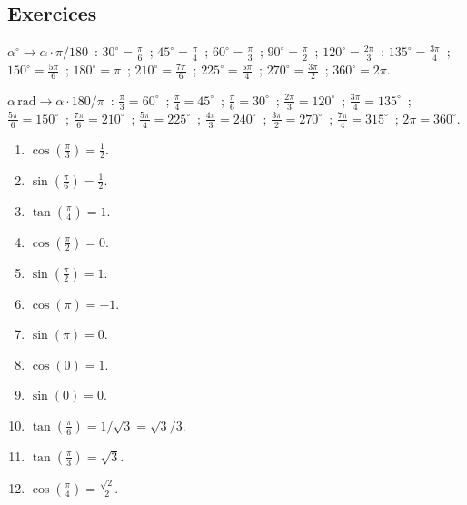 
\subsection*{Exercices}


$\alpha^{\circ}\to\alpha\cdot\pi/180$~:
$30^{\circ}=\frac{\pi}{6}$~; $45^{\circ}=\frac{\pi}{4}$~; $60^{\circ}=\frac{\pi}{3}$~; $90^{\circ}=\frac{\pi}{2}$~;
$120^{\circ}=\frac{2\pi}{3}$~; $135^{\circ}=\frac{3\pi}{4}$~; $150^{\circ}=\frac{5\pi}{6}$~; $180^{\circ}=\pi$~;
$210^{\circ}=\frac{7\pi}{6}$~; $225^{\circ}=\frac{5\pi}{4}$~; $270^{\circ}=\frac{3\pi}{2}$~; $360^{\circ}=2\pi$.


$\alpha\,\text{rad}\to\alpha\cdot180/\pi$~:
$\frac{\pi}{3}=60^{\circ}$~; $\frac{\pi}{4}=45^{\circ}$~; $\frac{\pi}{6}=30^{\circ}$~; $\frac{2\pi}{3}=120^{\circ}$~;
$\frac{3\pi}{4}=135^{\circ}$~; $\frac{5\pi}{6}=150^{\circ}$~; $\frac{7\pi}{6}=210^{\circ}$~; $\frac{5\pi}{4}=225^{\circ}$~;
$\frac{4\pi}{3}=240^{\circ}$~; $\frac{3\pi}{2}=270^{\circ}$~; $\frac{7\pi}{4}=315^{\circ}$~; $2\pi=360^{\circ}$.


\begin{enumerate}
  \item $\cos(\frac{\pi}{3})=\frac{1}{2}$.
  \item $\sin(\frac{\pi}{6})=\frac{1}{2}$.
  \item $\tan(\frac{\pi}{4})=1$.
  \item $\cos(\frac{\pi}{2})=0$.
  \item $\sin(\frac{\pi}{2})=1$.
  \item $\cos(\pi)=-1$.
  \item $\sin(\pi)=0$.
  \item $\cos(0)=1$.
  \item $\sin(0)=0$.
  \item $\tan(\frac{\pi}{6})=1/\sqrt{3}=\sqrt{3}/3$.
  \item $\tan(\frac{\pi}{3})=\sqrt{3}$.
  \item $\cos(\frac{\pi}{4})=\frac{\sqrt{2}}{2}$.
\end{enumerate}

